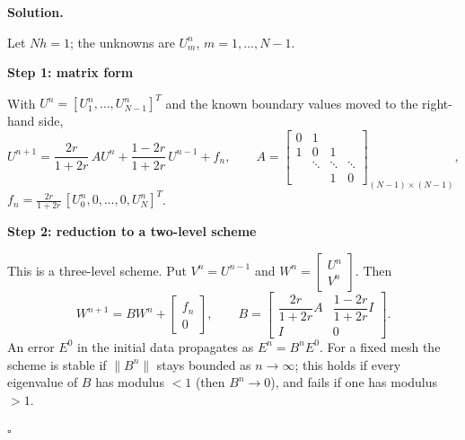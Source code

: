 \documentclass[11pt,a4paper]{article}
\newenvironment{solution}
  {\par\noindent\textbf{Solution.}\par\nobreak}
  {\par\hfill\(\square\)\par}
\newcommand{\step}[1]{\par\addvspace{0.5em}\noindent\textbf{#1}\par\nobreak}
\newcommand{\norm}[1]{\lVert#1\rVert}
\begin{document}
\begin{solution}
Let \(Nh=1\); the unknowns are \(U_m^n\), \(m=1,\dots,N-1\).

\step{Step 1: matrix form}
With \(U^n=[U_1^n,\dots,U_{N-1}^n]^T\) and the known boundary values
moved to the right-hand side,
\[
  U^{n+1}=\frac{2r}{1+2r}\,AU^n+\frac{1-2r}{1+2r}\,U^{n-1}+f_n,
  \qquad
  A=\begin{bmatrix}
    0&1&&\\
    1&0&1&\\
    &\ddots&\ddots&\ddots\\
    &&1&0
  \end{bmatrix}_{(N-1)\times(N-1)},
\]
\(f_n=\frac{2r}{1+2r}\,[U_0^n,0,\dots,0,U_N^n]^T\).

\step{Step 2: reduction to a two-level scheme}
This is a three-level scheme.  Put \(V^n=U^{n-1}\) and
\(W^n=\begin{bmatrix}U^n\\ V^n\end{bmatrix}\).  Then
\[
  W^{n+1}=BW^n+\begin{bmatrix}f_n\\0\end{bmatrix},
  \qquad
  B=\begin{bmatrix}
    \dfrac{2r}{1+2r}A&\dfrac{1-2r}{1+2r}I\\[8pt]
    I&0
  \end{bmatrix}.
\]
An error \(E^0\) in the initial data propagates as \(E^n=B^nE^0\).  For
a fixed mesh the scheme is stable if \(\norm{B^n}\) stays bounded as
\(n\to\infty\); this holds if every eigenvalue of \(B\) has modulus
\(<1\) (then \(B^n\to0\)), and fails if one has modulus \(>1\).


\end{solution}
\end{document}
